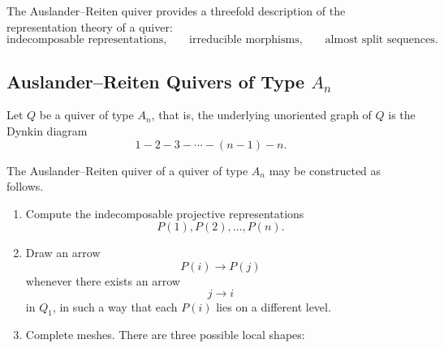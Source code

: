 \documentclass[11pt, a4paper]{report}
\begin{document}
    The Auslander--Reiten quiver provides a threefold description of the representation
    theory of a quiver:
    \[
        \text{indecomposable representations,}
        \qquad
        \text{irreducible morphisms,}
        \qquad
        \text{almost split sequences.}
    \]

    \subsection{Auslander--Reiten Quivers of Type \texorpdfstring{\(A_n\)}{A\_n}}

    Let \(Q\) be a quiver of type \(A_n\), that is, the underlying unoriented graph of
    \(Q\) is the Dynkin diagram
    \[
        1-2-3-\cdots-(n-1)-n.
    \]

    \begin{definition}
    The Auslander--Reiten quiver of a quiver of type \(A_n\) may be constructed as
    follows.

    \begin{enumerate}
        \item Compute the indecomposable projective representations
        \[
            P(1),P(2),\dots,P(n).
        \]

        \item Draw an arrow
        \[
            P(i)\longrightarrow P(j)
        \]
        whenever there exists an arrow
        \[
            j\longrightarrow i
        \]
        in \(Q_1\), in such a way that each \(P(i)\) lies on a different level.

        \item Complete meshes. There are three possible local shapes:

\end{enumerate}
\end{definition}
\end{document}
